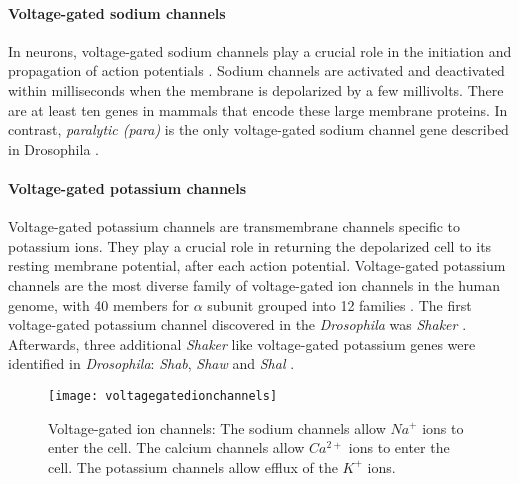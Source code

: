 \paragraph{Voltage-gated sodium channels}
In neurons, voltage-gated sodium channels play a crucial role in the initiation and propagation of action potentials \parencite{Hodgkin1952}. Sodium channels are activated and deactivated within milliseconds when the membrane is depolarized by a few millivolts. There are at least ten genes in mammals that encode these large membrane proteins. In contrast, \textit{paralytic (para)} is the only voltage-gated sodium channel gene described in Drosophila \parencite{Piggott2019}. %

\paragraph{Voltage-gated potassium channels}
Voltage-gated potassium channels are transmembrane channels specific to potassium ions. They play a crucial role in returning the depolarized cell to its resting membrane potential, after each action potential. Voltage-gated potassium channels are the most diverse family of voltage-gated ion channels in the human genome, with 40 members for $\alpha$ subunit grouped into 12 families \parencite{Gutman2005}. The first voltage-gated potassium channel discovered in the \textit{Drosophila} was \textit{Shaker} \parencite{Papazian1987}. Afterwards, three additional \textit{Shaker} like voltage-gated potassium genes were identified in \textit{Drosophila}: \textit{Shab}, \textit{Shaw} and \textit{Shal} \parencite{Covarrubias1991}. 

\begin{figure}
\centering
\hspace*{-1cm} 
\texttt{[image: voltagegatedionchannels]}
\caption[Voltage-gated ion channels] {Voltage-gated ion channels: The sodium channels allow $Na^{+}$ ions to enter the cell. The calcium channels allow $Ca^{2+}$ ions to enter the cell. The potassium channels allow efflux of the $K^{+}$ ions.}
\label{fig:vgatedionc}
\end{figure}


